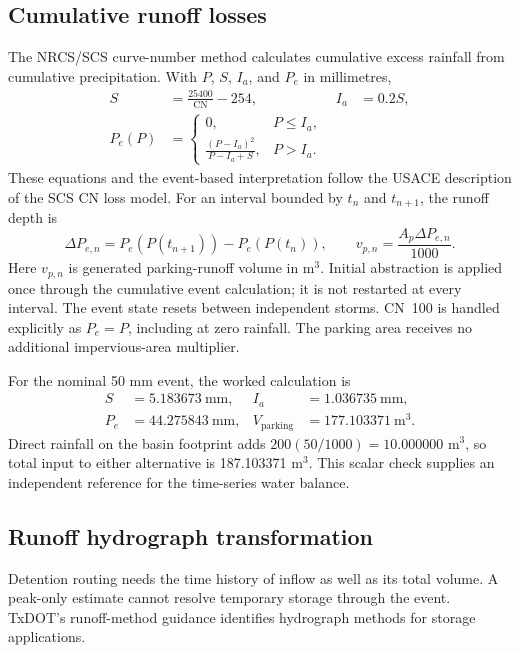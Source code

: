 \documentclass[11pt,letterpaper]{article}
\begin{document}
\subsection{Cumulative runoff losses}
The NRCS/SCS curve-number method calculates cumulative excess rainfall from
cumulative precipitation. With $P$, $S$, $I_a$, and $P_e$ in millimetres,
\begin{align}
 S &= \frac{25400}{\mathrm{CN}}-254, & I_a&=0.2S,\label{eq:retention}\\
 P_e(P)&=
 \begin{cases}
 0, & P\leq I_a,\\[2pt]
 \displaystyle\frac{(P-I_a)^2}{P-I_a+S}, & P>I_a.
 \end{cases}\label{eq:cn}
\end{align}
These equations and the event-based interpretation follow the USACE
description of the SCS CN loss model.\cite{cn}
For an interval bounded by $t_n$ and $t_{n+1}$, the runoff depth is
\begin{equation}
 \Delta P_{e,n}=P_e(P(t_{n+1}))-P_e(P(t_n)),\qquad
 v_{p,n}=\frac{A_p\Delta P_{e,n}}{1000}.
 \label{eq:excess}
\end{equation}
Here $v_{p,n}$ is generated parking-runoff volume in m$^3$. Initial abstraction
is applied once through the cumulative event calculation; it is not restarted
at every interval. The event state resets between independent storms.
CN~100 is handled explicitly as $P_e=P$, including at zero rainfall. The
parking area receives no additional impervious-area multiplier.

For the nominal 50 mm event, the worked calculation is
\begin{align*}
 S &= 5.183673\ \mathrm{mm}, & I_a&=1.036735\ \mathrm{mm},\\
 P_e &=44.275843\ \mathrm{mm}, &
 V_{\mathrm{parking}}&=177.103371\ \mathrm{m^3}.
\end{align*}
Direct rainfall on the basin footprint adds
$200(50/1000)=10.000000$ m$^3$, so total input to either alternative is
187.103371 m$^3$. This scalar check supplies an independent reference for the
time-series water balance.

\subsection{Runoff hydrograph transformation}
Detention routing needs the time history of inflow as well as its total
volume. A peak-only estimate cannot resolve temporary storage through the
event. TxDOT's runoff-method guidance identifies hydrograph methods for
storage applications.\cite{method_selection}
\end{document}
